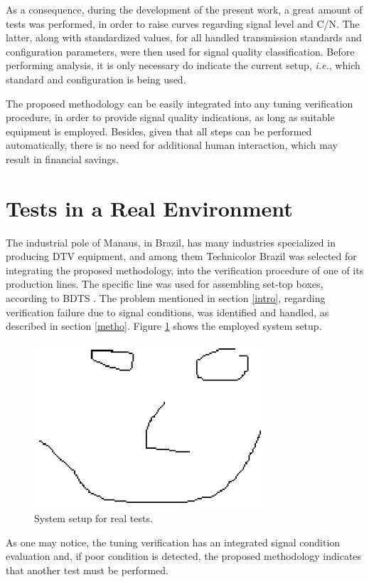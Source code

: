 \documentclass[conference]{IEEEtran}
\begin{document}
As a consequence, during the development of the present work, a great amount of tests was performed, in order to raise curves regarding signal level and C/N. The latter, along with standardized values, for all handled transmission standards and configuration parameters, were then used for signal quality classification. Before performing analysis, it is only necessary do indicate the current setup, {\it i.e.}, which standard and configuration is being used.

The proposed methodology can be easily integrated into any tuning verification procedure, in order to provide signal quality indications, as long as suitable equipment is employed. Besides, given that all steps can be performed automatically, there is no need for additional human interaction, which may result in financial savings.

\section{Tests in a Real Environment}

The industrial pole of Manaus, in Brazil, has many industries specialized in producing DTV equipment, and among them Technicolor Brazil was selected for integrating the proposed methodology, into the verification procedure of one of its production lines. The specific line was used for assembling set-top boxes, according to BDTS \cite{sbtvd}. The problem mentioned in section \ref{intro}, regarding verification failure due to signal conditions, was identified and handled, as described in section \ref{metho}. Figure \ref{figure:fig1} shows the employed system setup.

\begin{figure}[ht]
\centerline{\includegraphics[width=3.4in]{Fig1.eps}}
\caption{System setup for real tests.}
\label{figure:fig1}
\end{figure}

As one may notice, the tuning verification has an integrated signal condition evaluation and, if poor condition is detected, the proposed methodology indicates that another test must be performed. 
\end{document}
